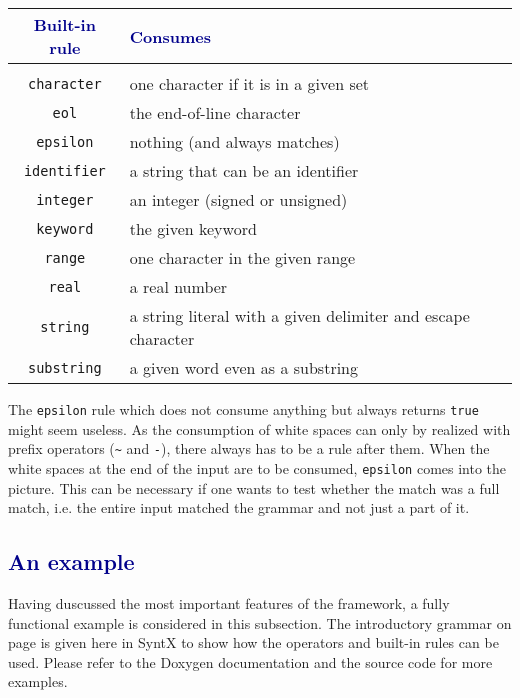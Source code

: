 \documentclass[12pt]{article}
\newcommand{\usubsec}[2]{\subsection*{\textcolor{darkblue}{#1}}\label{subsec:#2}\addcontentsline{toc}{subsection}{#1}}
\begin{document}
\begin{table}[h]
	\begin{center}
		\begin{tabular}{cp{22em}}
			\textcolor{darkblue}{\textbf{Built-in rule}} & \textcolor{darkblue}{\textbf{Consumes}} \\
			\hline\\
			\vspace{0.3em}
			\texttt{character} & one character if it is in a given set\\
			\texttt{eol} & the end-of-line character\\
			\texttt{epsilon} & nothing (and always matches)\\
			\texttt{identifier} & a string that can be an identifier\\
			\texttt{integer} & an integer (signed or unsigned)\\
			\texttt{keyword} & the given keyword\\
			\texttt{range} & one character in the given range\\
			\texttt{real} & a real number\\
			\texttt{string} & a string literal with a given delimiter and escape character \\
			\texttt{substring} & a given word even as a substring\\
		\end{tabular}
	\end{center}
\end{table}

The \texttt{epsilon} rule which does not consume anything but always returns \texttt{true} might seem useless.
As the consumption of white spaces can only by realized with prefix operators (\verb!~! and \verb!-!), there
always has to be a rule after them. When the white spaces at the end of the input are to be consumed,
\texttt{epsilon} comes into the picture. This can be necessary if one wants to test whether the match was a
full match, i.e. the entire input matched the grammar and not just a part of it.

\usubsec{An example}{example}
Having duscussed the most important features of the framework, a fully functional example is considered in
this subsection. The introductory grammar on page \pageref{lst:hellogrammar} is given here in SyntX to show
how the operators and built-in rules can be used. Please refer to the Doxygen documentation and the source
code for more examples.
\end{document}
